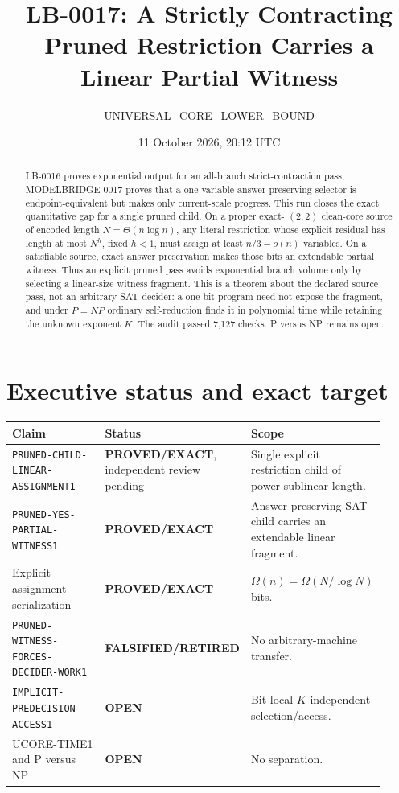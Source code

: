 \documentclass[11pt]{article}
\title{LB-0017: A Strictly Contracting Pruned Restriction Carries a Linear Partial Witness}
\author{UNIVERSAL\_CORE\_LOWER\_BOUND}
\date{11 October 2026, 20:12 UTC}
\newcommand{\EXACT}{\textbf{PROVED/EXACT}}
\newcommand{\OPEN}{\textbf{OPEN}}
\newcommand{\RETIRED}{\textbf{FALSIFIED/RETIRED}}
\begin{document}
\maketitle

\begin{abstract}
LB-0016 proves exponential output for an all-branch strict-contraction pass;
MODELBRIDGE-0017 proves that a one-variable answer-preserving selector is
endpoint-equivalent but makes only current-scale progress.  This run closes
the exact quantitative gap for a single pruned child.  On a proper exact-
$(2,2)$ clean-core source of encoded length $N=\Theta(n\log n)$, any literal
restriction whose explicit residual has length at most $N^h$, fixed $h<1$,
must assign at least $n/3-o(n)$ variables.  On a satisfiable source, exact
answer preservation makes those bits an extendable partial witness.  Thus an
explicit pruned pass avoids exponential branch volume only by selecting a
linear-size witness fragment.  This is a theorem about the declared source
pass, not an arbitrary SAT decider: a one-bit program need not expose the
fragment, and under $P=NP$ ordinary self-reduction finds it in polynomial time
while retaining the unknown exponent $K$.  The audit passed 7,127 checks.
P versus NP remains open.
\end{abstract}

\section{Executive status and exact target}

\begin{center}\small
\begin{tabular}{@{}p{0.42\linewidth}p{0.19\linewidth}p{0.31\linewidth}@{}}
\toprule
Claim & Status & Scope\\ \midrule
\texttt{PRUNED-CHILD-LINEAR-ASSIGNMENT1} & \EXACT, independent review pending &
Single explicit restriction child of power-sublinear length.\\
\texttt{PRUNED-YES-PARTIAL-WITNESS1} & \EXACT &
Answer-preserving SAT child carries an extendable linear fragment.\\
Explicit assignment serialization & \EXACT & $\Omega(n)=\Omega(N/\log N)$ bits.\\
\texttt{PRUNED-WITNESS-FORCES-DECIDER-WORK1} & \RETIRED &
No arbitrary-machine transfer.\\
\texttt{IMPLICIT-PREDECISION-ACCESS1} & \OPEN &
Bit-local $K$-independent selection/access.\\
UCORE-TIME1 and P versus NP & \OPEN & No separation.\\
\bottomrule
\end{tabular}
\end{center}
\end{document}

